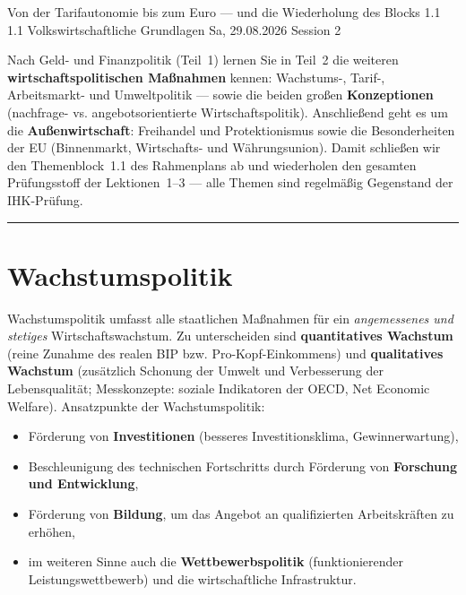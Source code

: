 \documentclass[11pt, a4paper]{article}
\begin{document}
%
  {Von der Tarifautonomie bis zum Euro --- und die Wiederholung des Blocks 1.1}%
  {1.1 Volkswirtschaftliche Grundlagen}%
  {Sa, 29.08.2026 \textperiodcentered{} Session 2}

\begin{merksatz}[title={\bfseries Worum geht es in diesem Teil?}]
Nach Geld- und Finanzpolitik (Teil~1) lernen Sie in Teil~2 die weiteren
\textbf{wirtschaftspolitischen Maßnahmen} kennen: Wachstums-, Tarif-, Arbeitsmarkt- und
Umweltpolitik --- sowie die beiden großen \textbf{Konzeptionen} (nachfrage- vs.
angebotsorientierte Wirtschaftspolitik). Anschließend geht es um die
\textbf{Außenwirtschaft}: Freihandel und Protektionismus sowie die Besonderheiten der EU
(Binnenmarkt, Wirtschafts- und Währungsunion). Damit schließen wir den Themenblock~1.1
des Rahmenplans ab und wiederholen den gesamten Prüfungsstoff der Lektionen~1--3 ---
alle Themen sind regelmäßig Gegenstand der IHK-Prüfung.
\end{merksatz}

\tableofcontents
\vspace{1em}
\hrule
\vspace{1em}

\section{Wachstumspolitik}

Wachstumspolitik umfasst alle staatlichen Maßnahmen für ein \emph{angemessenes und
stetiges} Wirtschaftswachstum. Zu unterscheiden sind \textbf{quantitatives Wachstum}
(reine Zunahme des realen BIP bzw. Pro-Kopf-Einkommens) und \textbf{qualitatives Wachstum}
(zusätzlich Schonung der Umwelt und Verbesserung der Lebensqualität; Messkonzepte: soziale
Indikatoren der OECD, Net Economic Welfare). Ansatzpunkte der Wachstumspolitik:

\begin{itemize}
  \item Förderung von \textbf{Investitionen} (besseres Investitionsklima, Gewinnerwartung),
  \item Beschleunigung des technischen Fortschritts durch Förderung von
    \textbf{Forschung und Entwicklung},
  \item Förderung von \textbf{Bildung}, um das Angebot an qualifizierten Arbeitskräften zu
    erhöhen,
  \item im weiteren Sinne auch die \textbf{Wettbewerbspolitik} (funktionierender
    Leistungswettbewerb) und die wirtschaftliche Infrastruktur.
\end{itemize}
\end{document}
